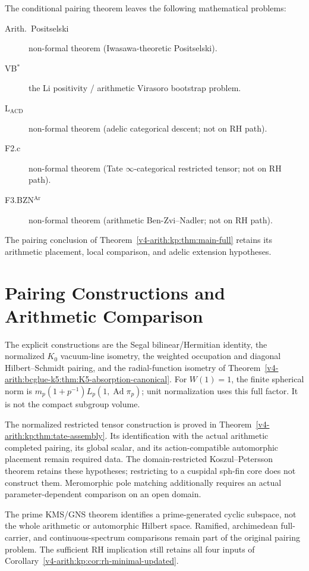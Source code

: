 \begin{remark}
\label{v4-arith:kp:rem:substantial-reestimate}
The conditional pairing theorem leaves the following mathematical
problems:
\begin{description}
\item[Arith.~Positselski] non-formal theorem (Iwasawa-theoretic Positselski).
\item[VB\(^{*}\)] the Li positivity / arithmetic Virasoro bootstrap problem.
\item[\(\mathrm{L}_{\mathrm{ACD}}\)] non-formal theorem (adelic
categorical descent; not on RH path).
\item[F2.c] non-formal theorem (Tate \(\infty\)-categorical restricted
tensor; not on RH path).
\item[F3.BZN\(^{\mathrm{Ar}}\)] non-formal theorem (arithmetic
Ben-Zvi--Nadler; not on RH path).
\end{description}
The pairing conclusion of Theorem~\ref{v4-arith:kp:thm:main-full}
retains its arithmetic placement, local comparison, and adelic
extension hypotheses.
\end{remark}

\section{Pairing Constructions and Arithmetic Comparison}
\label{v4-arith:kp:summary}
The explicit constructions are the Segal bilinear/Hermitian identity,
the normalized \(K_0\) vacuum-line isometry, the weighted occupation
and diagonal Hilbert--Schmidt pairing, and the radial-function
isometry of Theorem~\ref{v4-arith:bcglue-k5:thm:K5-absorption-canonical}.
For \(W(1)=1\), the finite spherical norm is
\(m_p(1+p^{-1})L_p(1,\operatorname{Ad}\pi_p)\); unit normalization
uses this full factor. It is not the compact subgroup volume.

The normalized restricted tensor construction is proved in
Theorem~\ref{v4-arith:kp:thm:tate-assembly}. Its identification with
the actual arithmetic completed pairing, its global scalar, and
its action-compatible automorphic placement remain required data.
The domain-restricted Koszul--Petersson theorem retains these
hypotheses; restricting to a cuspidal sph-fin core does not construct
them. Meromorphic pole matching additionally requires an actual
parameter-dependent comparison on an open domain.

The prime KMS/GNS theorem identifies a prime-generated cyclic
subspace, not the whole arithmetic or automorphic Hilbert space.
Ramified, archimedean full-carrier, and continuous-spectrum
comparisons remain part of the original pairing problem.
The sufficient RH implication still retains all four inputs of
Corollary~\ref{v4-arith:kp:cor:rh-minimal-updated}.
